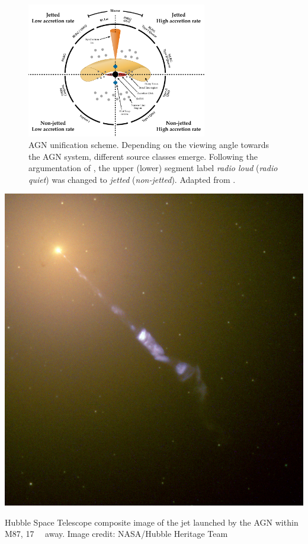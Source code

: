 \documentclass[
    a4paper, %
    fontsize=10pt, %
    twoside=false, %
    numbers=noenddot, %
    fontmethod=tex,
]{kaobook}
\begin{document}
\begin{figure}[htb]
    \includegraphics[width=0.7\textwidth]{theory/agn_unification.pdf}
    \caption[AGN]{AGN unification scheme. Depending on the viewing angle towards the AGN system, different source classes emerge. Following the argumentation of \cite{Padovani2017}, the upper (lower) segment label \textit{radio loud} (\textit{radio quiet}) was changed to \textit{jetted} (\textit{non-jetted}). Adapted from \cite{Thorne2022}.}
\end{figure}

\begin{marginfigure}
    \includegraphics{theory/m87.jpg}
    \caption[M87 jet]{Hubble Space Telescope composite image of the jet launched by the AGN within M87, \SI{17}{\mega\parsec} away. Image credit: NASA/Hubble Heritage Team}
\end{marginfigure}
\end{document}
